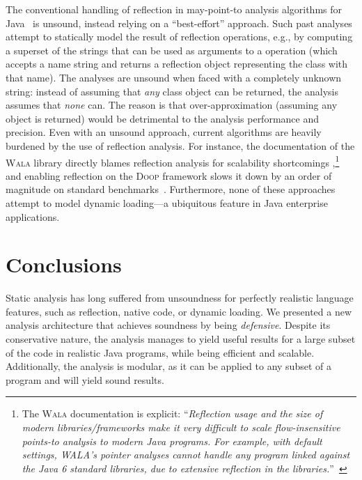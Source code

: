 The conventional handling of reflection in may-point-to analysis
algorithms for
Java~\cite{www:wala-reflection,ecoop/LiTSX14,aplas/LivshitsWL05,livshits:thesis,aplas/Smaragdakis15,DBLP:conf/sas/LiTX15}
is unsound, instead relying on a ``best-effort'' approach.  Such past
analyses attempt to statically model the result of reflection
operations, e.g., by computing a superset of the strings that can be
used as arguments to a  operation (which accepts a
name string and returns a reflection object representing the class
with that name).
The analyses are unsound when faced with a completely unknown string:
instead of assuming that \emph{any} class object can be returned, the
analysis assumes that \emph{none} can. The reason is that
over-approximation (assuming any object is returned) would be
detrimental to the analysis performance and precision. Even with an
unsound approach, current algorithms are heavily burdened by the use
of reflection analysis. For instance, the documentation of the
\textsc{Wala} library directly blames reflection analysis for
scalability shortcomings
\cite{www:wala-reflection},\footnote{The \textsc{Wala} documentation
  is explicit: ``\emph{Reflection usage and the
    size of modern libraries/frameworks make it very difficult to
    scale flow-insensitive points-to analysis to modern Java
    programs. For example, with default settings, WALA's pointer
    analyses cannot handle any program linked against the Java 6
    standard libraries, due to extensive reflection in the
    libraries.}''~\cite{www:wala-reflection}} and enabling reflection
on the \textsc{Doop} framework slows it down by an order of magnitude
on standard benchmarks~\cite{aplas/Smaragdakis15}.
Furthermore, none
of these approaches attempt to model dynamic loading---a ubiquitous
feature in Java enterprise applications.





\section{Conclusions}

Static analysis has long suffered from unsoundness for perfectly
realistic language features, such as reflection, native code, or
dynamic loading. We presented a new analysis architecture that
achieves soundness by being \emph{defensive}. Despite its conservative
nature, the analysis manages to yield useful results for a large
subset of the code in realistic Java programs, while being efficient
and scalable. Additionally, the analysis is modular, as it can be
applied to any subset of a program and will yield sound results.

